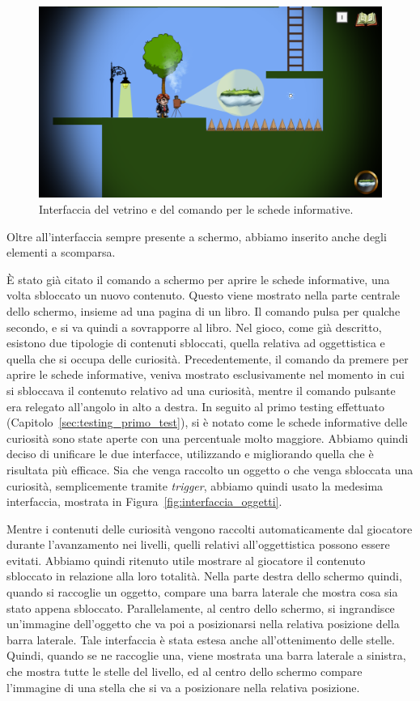 \begin{figure}%
	\centering
	\includegraphics[width= 0.9\columnwidth]{images/gameDesign/56_interfaccia.png}
	\caption{Interfaccia del vetrino e del comando per le schede informative.}
	\label{fig:interfaccia_ingame}
\end{figure}

Oltre all’interfaccia sempre presente a schermo, abbiamo inserito anche degli elementi a scomparsa.

È stato già citato il comando a schermo per aprire le schede informative, una volta sbloccato un nuovo contenuto. Questo viene mostrato nella parte centrale dello schermo, insieme ad una pagina di un libro. Il comando pulsa per qualche secondo, e si va quindi a sovrapporre al libro.
Nel gioco, come già descritto, esistono due tipologie di contenuti sbloccati, quella relativa ad oggettistica e quella che si occupa delle curiosità. Precedentemente, il comando da premere per aprire le schede informative, veniva mostrato esclusivamente nel momento in cui si sbloccava il contenuto relativo ad una curiosità, mentre il comando pulsante era relegato all’angolo in alto a destra. In seguito al primo testing effettuato (Capitolo~\ref{sec:testing_primo_test}), si è notato come le schede informative delle curiosità sono state aperte con una percentuale molto maggiore. Abbiamo quindi deciso di unificare le due interfacce, utilizzando e migliorando quella che è risultata più efficace.
Sia che venga raccolto un oggetto o che venga sbloccata una curiosità, semplicemente tramite \textit{trigger}, abbiamo quindi usato la medesima interfaccia, mostrata in Figura~\ref{fig:interfaccia_oggetti}.

Mentre i contenuti delle curiosità vengono raccolti automaticamente dal giocatore durante l’avanzamento nei livelli, quelli relativi all’oggettistica possono essere evitati. Abbiamo quindi ritenuto utile mostrare al giocatore il contenuto sbloccato in relazione alla loro totalità. Nella parte destra dello schermo quindi, quando si raccoglie un oggetto, compare una barra laterale che mostra cosa sia stato appena sbloccato.
Parallelamente, al centro dello schermo, si ingrandisce un’immagine dell’oggetto che va poi a posizionarsi nella relativa posizione della barra laterale.
Tale interfaccia è stata estesa anche all’ottenimento delle stelle. Quindi, quando se ne raccoglie una, viene mostrata una barra laterale a sinistra, che mostra tutte le stelle del livello, ed al centro dello schermo compare l’immagine di una stella che si va a posizionare nella relativa posizione.


